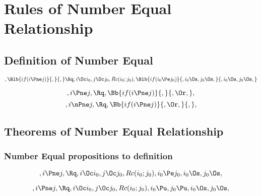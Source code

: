 \chapter{Rules of Number Equal Relationship}

\section{Definition of Number Equal}
\[,\Blb{if(i \Pne j)}{,}{,} \Rq , i \Oc i_0, j \Oc j_0, Rc(i_0; j_0), \Blb{if(i_0 \Pe j_0)}{,i_0 \Os, j_0 \Os, }{, i_0 \Os, j_0 \Os, }\]

\bigskip
\bigskip
\[, i \Pne j, \Rq , \Bb{if(i \Pne j)}{,}{, \Or,},\]
\bigskip
\bigskip
\[, i \nPne j, \Rq , \Bb{if(i \Pne j)}{, \Or,}{,},\]
\bigskip
\bigskip


\bigskip
\bigskip
\section{Theorems of  Number Equal Relationship}
\subsection{Number Equal propositions to definition}
\[,i \Pne j, \Rq ,  i \Oc i_0, j \Oc j_0, Rc(i_0; j_0), i_0 \Pe j_0, i_0 \Os, j_0 \Os,\]




\[,i \Pne j, \Rq ,  i \Oc i_0, j \Oc j_0, Rc(i_0; j_0), i_0 \Pu, j_0 \Pu, i_0 \Os, j_0 \Os,\]

